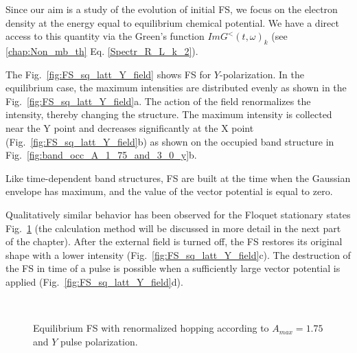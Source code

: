 Since our aim is a study of the evolution of initial FS, we focus on the electron density at the energy equal to equilibrium chemical potential. We have a direct access to this quantity via the Green's function $ImG^{<}(t,\omega)_k$ (see \autoref{chap:Non_mb_th} Eq. \ref{Spectr_R_L_k_2}).
 
The Fig.~\ref{fig:FS_sq_latt_Y_field} shows FS for $Y$-polarization. In the equilibrium case, the maximum intensities are distributed evenly as shown in the Fig.~\ref{fig:FS_sq_latt_Y_field}a. 
The action of the field renormalizes the intensity, thereby changing the structure. 
The maximum intensity is collected near the Y point and decreases significantly at the X point (Fig.~\ref{fig:FS_sq_latt_Y_field}b) as shown on the occupied band structure in Fig.~\ref{fig:band_occ_A_1_75_and_3_0_y}b. 

Like time-dependent band structures, FS are built at the time when the Gaussian envelope has maximum, and the value of the vector potential is equal to zero.

Qualitatively similar behavior has been observed for the 
Floquet stationary states Fig.~\ref{fig:FS_equilibrium_sq_latt_Y_field} (the calculation method will be discussed in more detail in the next part of the chapter). 
After the external field is turned off, the FS restores its original shape with a lower intensity (Fig.~\ref{fig:FS_sq_latt_Y_field}c). 
The destruction of the FS in time of a pulse is possible when a sufficiently large vector potential is applied (Fig.~\ref{fig:FS_sq_latt_Y_field}d).



\begin{figure}[h!]
 \\
\caption{Equilibrium FS with renormalized hopping according to $A_{max}=1.75$ and $Y$ pulse polarization.}
\label{fig:FS_equilibrium_sq_latt_Y_field}
\end{figure}

